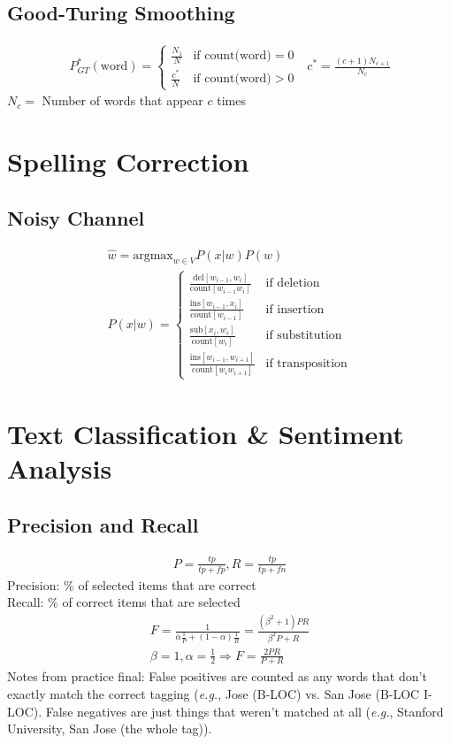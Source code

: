 \documentclass[10pt,twocolumn]{amsart}
\begin{document}
\subsection{Good-Turing Smoothing}
\begin{gather*}
P_{GT}^{*}\left(\text{word}\right) = \begin{cases}
                                     \frac{N_{1}}{N} & \text{if count(word)} = 0\\
                                     \frac{c^{*}}{N} & \text{if count(word)} > 0
                                     \end{cases}
\text{ }c^{*} = \frac{\left(c+1\right)N_{c+1}}{N_{c}}
\end{gather*}
$N_{c} = $ Number of words that appear $c$ times
\section{Spelling Correction}
\subsection{Noisy Channel}
\begin{gather*}
\hat{w} = \text{argmax}_{w \in V} P(x|w)P(w)\\
P(x|w) = \begin{cases}
   \frac{\text{del}[w_{i-1},w_i]}{\text{count}[w_{i-1}w_i]} & \text{if deletion} \\
   \frac{\text{ins}[w_{i-1},x_i]}{\text{count}[w_{i-1}]} & \text{if insertion} \\
   \frac{\text{sub}[x_{i},w_i]}{\text{count}[w_{i}]} & \text{if substitution} \\
   \frac{\text{ins}[w_{i-1},w_{i+1}]}{\text{count}[w_{i}w_{i+1}]} 
        & \text{if transposition}
          \end{cases}
\end{gather*}
\section{Text Classification \& Sentiment Analysis}
\subsection{Precision and Recall}
\begin{gather*}
P = \frac{tp}{tp+fp} , R =  \frac{tp}{tp+fn}
\end{gather*}
Precision: \% of selected items that are correct \\
Recall: \% of correct items that are selected
\begin{gather*}
F = \frac{1}{\alpha \frac{1}{P} + (1 - \alpha) \frac{1}{R}} = 
    \frac{\left(\beta^2 + 1\right)PR}{\beta^2 P + R} \\
\beta = 1, \alpha = \frac{1}{2} \Rightarrow \boxed{F = \frac{2PR}{P+R}}
\end{gather*}
Notes from practice final: False positives are counted as any words that don't
exactly match the correct tagging (\emph{e.g.}, Jose (B-LOC) vs. San Jose
(B-LOC I-LOC). False negatives are just things that weren't matched at all
(\emph{e.g.}, Stanford University, San Jose (the whole tag)). 
\end{document}
